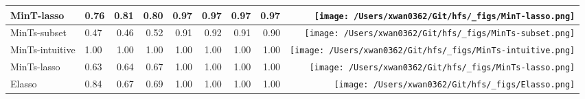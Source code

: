 \documentclass[
  letterpaper,
  DIV=11,
  numbers=noendperiod]{scrartcl}
\begin{document}
\begin{table}[!h]
{\begin{tabular}{llrrrrrr>{}r}
MinT-lasso & 0.76 & 0.81 & 0.80 & 0.97 & 0.97 & 0.97 & 0.97 & \texttt{[image: /Users/xwan0362/Git/hfs/\_figs/MinT-lasso.png]}\\
\midrule
MinTs-subset & 0.47 & 0.46 & 0.52 & 0.91 & 0.92 & 0.91 & 0.90 & \texttt{[image: /Users/xwan0362/Git/hfs/\_figs/MinTs-subset.png]}\\
MinTs-intuitive & 1.00 & 1.00 & 1.00 & 1.00 & 1.00 & 1.00 & 1.00 & \texttt{[image: /Users/xwan0362/Git/hfs/\_figs/MinTs-intuitive.png]}\\
MinTs-lasso & 0.63 & 0.64 & 0.67 & 1.00 & 1.00 & 1.00 & 1.00 & \texttt{[image: /Users/xwan0362/Git/hfs/\_figs/MinTs-lasso.png]}\\
\midrule
Elasso & 0.84 & 0.67 & 0.69 & 1.00 & 1.00 & 1.00 & 1.00 & \texttt{[image: /Users/xwan0362/Git/hfs/\_figs/Elasso.png]}\\
\bottomrule
\end{tabular}}
\end{table}
\end{document}
